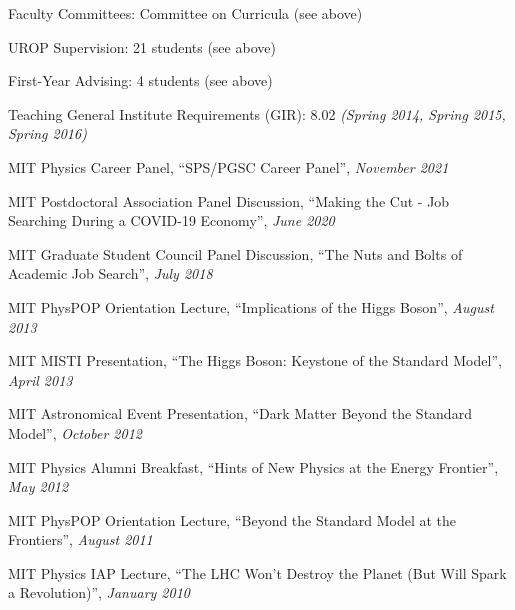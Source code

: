 \item Faculty Committees: Committee on Curricula (see above) 
\item UROP Supervision: 21 students (see above) 
\item First-Year Advising: 4 students (see above) 
\item Teaching General Institute Requirements (GIR):  8.02 \emph{(Spring 2014, Spring 2015, Spring 2016)}
\item MIT Physics Career Panel, ``SPS/PGSC Career Panel'', \emph{November 2021}
\item MIT Postdoctoral Association Panel Discussion, ``Making the Cut - Job Searching During a COVID-19 Economy'', \emph{June 2020}
\item MIT Graduate Student Council Panel Discussion, ``The Nuts and Bolts of Academic Job Search'', \emph{July 2018}
\item MIT PhysPOP Orientation Lecture, ``Implications of the Higgs Boson'', \emph{August 2013}
\item MIT MISTI Presentation, ``The Higgs Boson: Keystone of the Standard Model'', \emph{April 2013}
\item MIT Astronomical Event Presentation, ``Dark Matter Beyond the Standard Model'', \emph{October 2012}
\item MIT Physics Alumni Breakfast, ``Hints of New Physics at the Energy Frontier'', \emph{May 2012}
\item MIT PhysPOP Orientation Lecture, ``Beyond the Standard Model at the Frontiers'', \emph{August 2011}
\item MIT Physics IAP Lecture, ``The LHC Won’t Destroy the Planet (But Will Spark a Revolution)'', \emph{January 2010}
